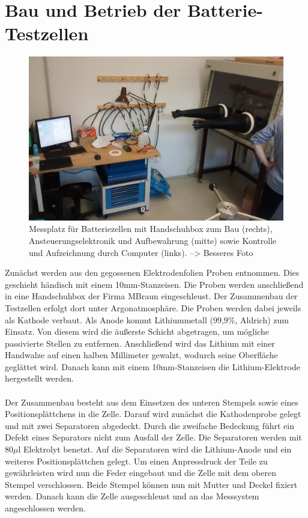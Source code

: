 \documentclass[a4paper, 11pt, headsepline,footsepline,twoside,abstract]{scrbook}
\begin{document}
\section{Bau und Betrieb der Batterie-Testzellen}
\label{bau_zellen}
\begin{figure}
	\centering
	\includegraphics[width=0.95\columnwidth]{images/Messplatz.jpg}
	\caption{Messplatz für Batteriezellen mit Handschuhbox zum Bau (rechts), Ansteuerungselektronik und Aufbewahrung (mitte) sowie Kontrolle und Aufzeichnung durch Computer (links). --> Besseres Foto}
	\label{messaufbau}
\end{figure}
Zunächst werden aus den gegossenen Elektrodenfolien Proben entnommen. Dies geschieht händisch mit einem 10mm-Stanzeisen. Die Proben werden anschließend in eine Handschuhbox der Firma MBraun eingeschleust. Der Zusammenbau der Testzellen erfolgt dort unter Argonatmosphäre. Die Proben werden dabei jeweils als Kathode verbaut. Als Anode kommt Lithiummetall (99,9\%, Aldrich) zum Einsatz. Von diesem wird die äußerste Schicht abgetragen, um mögliche passivierte Stellen zu entfernen. Anschließend wird das Lithium mit einer Handwalze auf einen halben Millimeter gewalzt, wodurch seine Oberfläche geglättet wird. Danach kann mit einem 10mm-Stanzeisen die Lithium-Elektrode hergestellt werden.
\\\\
Der Zusammenbau besteht aus dem Einsetzen des unteren Stempels sowie eines Positionsplättchens in die Zelle. Darauf wird zunächst die Kathodenprobe gelegt und mit zwei Separatoren abgedeckt. Durch die zweifache Bedeckung führt ein Defekt eines Separators nicht zum Ausfall der Zelle. Die Separatoren werden mit 80$\mu$l Elektrolyt benetzt. Auf die Separatoren wird die Lithium-Anode und ein weiteres Positionsplättchen gelegt. Um einen Anpressdruck der Teile zu gewährleisten wird nun die Feder eingebaut und die Zelle mit dem oberen Stempel verschlossen. Beide Stempel können nun mit Mutter und Deckel fixiert werden. Danach kann die Zelle ausgeschleust und an das Messsystem angeschlossen werden.
\\\\
\end{document}
